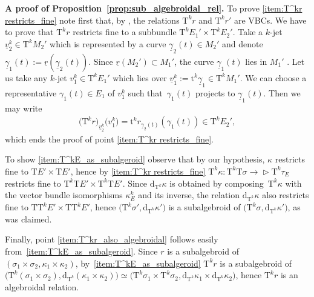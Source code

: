 \documentclass[10pt,a4paper]{amsart}
\newcommand{\ZM}{{VBC}} %
\newcommand{\und}{\underline}
\newcommand{\dd}{\mathrm{d}}
\newcommand{\T}{\mathrm{T}} %
\newcommand{\TT}[1]{\mathrm{T}^{#1}} %
\newcommand{\tclass}[2]{\bm{\mathrm{t}}^{#1}#2} %
\def\relto{\rightarrow\!\!\vartriangleright} %
\numberwithin{equation}{section}
\theoremstyle{definition}
\begin{document}
{\bf A proof of Proposition~\ref{prop:sub_algebroidal_rel}.} %
 To prove \eqref{item:T^kr restricts_fine} note first that, by \cite[Theorem~A.5]{MJ_MR_models_high_alg_2015}, the relations $\TT{k} r$ and $\TT{k} r'$ are \ZM s. We have to prove that $\TT{k} r$ restricts fine to a subbundle $\TT{k} E_1'\times \TT{k} E_2'$. Take a $k$-jet $\und{v}_2^k\in \TT{k} M_2'$ which is represented by a curve $\und{\gamma}_2(t)\in M_2'$ and denote $\und{\gamma}_1(t):=\und{r}(\und{\gamma}_2(t))$. Since $\und{r}(M_2')\subset M_1'$, the curve $\und{\gamma}_1(t)$ lies in $M_1'$ . Let us take any $k$-jet $v_1^k\in \TT{k} E_1'$ which lies over $\und{v}_1^k :=\tclass{k}{\und{\gamma}_1} \in \TT{k} M_1'$. We can choose a representative $\gamma_1(t)\in E_1$ of $v_1^k$ such that~$\gamma_1(t)$ projects to $\und{\gamma}_1(t)$. Then we may write
\begin{gather*}
\big(\TT{k} r\big)_{\und{v}_2^k}\big(v_1^k\big) = \tclass{k}{ r_{\und{\gamma}_2(t)}(\gamma_1(t))}\in \TT{k} E_2',
\end{gather*}
which ends the proof of point \eqref{item:T^kr restricts_fine}.

 To show \eqref{item:T^kE_as_subalgeroid} observe that by our hypothesis, $\kappa$ restricts fine to $\T E'\times \T E'$, hence by \eqref{item:T^kr restricts_fine} $\TT{k} \kappa\colon \TT{k} \T \sigma\relto \TT{k} \tau_{E}$ restricts fine to $\TT{k}\T E'\times \TT{k} \T E'$. Since $\dd_{\TT{k}}\kappa$ is obtained by composing~$\TT{k} \kappa$ with the vector bundle isomorphisms $\kappa^k_E$ and its inverse, the relation $\dd_{\TT{k}}\kappa$ also restricts fine to $\T \TT{k} E'\times \T \TT{k} E'$, hence $\big(\TT{k} \sigma',\dd_{\TT{k}}\kappa'\big)$ is a subalgebroid of $\big(\TT{k} \sigma, \dd_{\TT{k}}\kappa'\big)$, as was claimed.

 Finally, point \eqref{item:T^kr_also_algebroidal} follows easily from~\eqref{item:T^kE_as_subalgeroid}. Since $r$ is a subalgebroid of $(\sigma_1\times\sigma_2,\kappa_1\times\kappa_2)$, by~\eqref{item:T^kE_as_subalgeroid} $\TT{k} r$ is a subalgebroid of $\big(\TT{k}(\sigma_1\times \sigma_2), \dd_{\TT{k}}(\kappa_1\times\kappa_2)\big) \simeq \big(\TT{k} \sigma_1\times \TT{k}\sigma_2,\dd_{\TT k}\kappa_1\times\dd_{\TT k}\kappa_2\big)$, hence $\TT{k} r$ is an algebroidal relation. %
\end{document}
